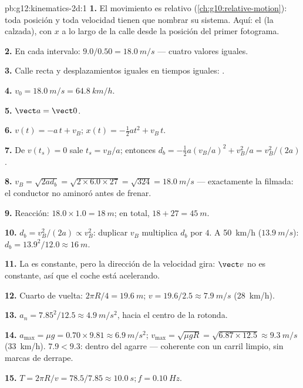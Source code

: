 \begin{solution}{pb:g12:kinematics-2d:1}
\textbf{1.} El movimiento es relativo
(\cref{ch:g10:relative-motion}): toda posición y toda velocidad tienen
que nombrar su sistema. Aquí: el  (la calzada), con $x$
a lo largo de la calle desde la posición del primer fotograma.

\textbf{2.} En cada intervalo: $9.0/0.50 = \qty{18.0}{m/s}$ --- cuatro
valores iguales.

\textbf{3.} Calle recta y desplazamientos iguales en tiempos iguales:
.

\textbf{4.} $v_0 = \qty{18.0}{m/s} = \qty{64.8}{km/h}$.

\textbf{5.} $\vect a = \vect 0$.

\textbf{6.} $v(t) = -a\,t + v_B$; $x(t) = -\tfrac12 a t^2 + v_B\,t$.

\textbf{7.} De $v(t_s) = 0$ sale $t_s = v_B/a$; entonces
$d_b = -\tfrac12 a (v_B/a)^2 + v_B^2/a = v_B^2/(2a)$.

\textbf{8.} $v_B = \sqrt{2 a d_b} = \sqrt{2 \times 6.0 \times 27} =
\sqrt{324} = \qty{18.0}{m/s}$ --- exactamente la  filmada: el
conductor no aminoró antes de frenar.

\textbf{9.} Reacción: $18.0 \times 1.0 = \qty{18}{m}$; en total,
$18 + 27 = \qty{45}{m}$.

\textbf{10.} $d_b = v_B^2/(2a) \propto v_B^2$: duplicar $v_B$
multiplica $d_b$ por $4$. A \qty{50}{km/h} ($\qty{13.9}{m/s}$):
$d_b = 13.9^2/12.0 \approx \qty{16}{m}$.

\textbf{11.} La  es constante, pero la dirección de la velocidad
gira: $\vect v$ no es constante, así que el coche está acelerando.

\textbf{12.} Cuarto de vuelta: $2\pi R/4 = \qty{19.6}{m}$;
$v = 19.6/2.5 \approx \qty{7.9}{m/s}$ (\qty{28}{km/h}).

\textbf{13.} $a_n = 7.85^2/12.5 \approx \qty{4.9}{m/s^2}$, hacia el
centro de la rotonda.

\textbf{14.} $a_{\max} = \mu g = 0.70 \times 9.81 \approx
\qty{6.9}{m/s^2}$;
$v_{\max} = \sqrt{\mu g R} = \sqrt{6.87 \times 12.5} \approx
\qty{9.3}{m/s}$ (\qty{33}{km/h}). $7.9 < 9.3$: dentro del agarre ---
coherente con un carril limpio, sin marcas de derrape.

\textbf{15.} $T = 2\pi R/v = 78.5/7.85 \approx \qty{10.0}{s};
f = \qty{0.10}{Hz}$.


\end{solution}
